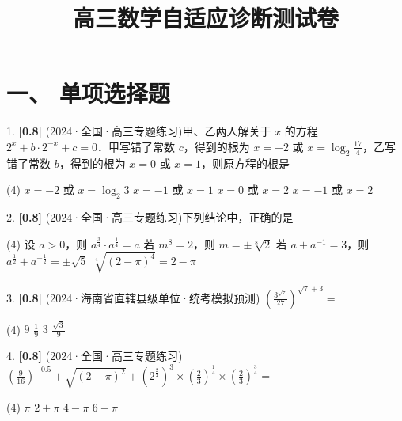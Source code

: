 \documentclass[11pt,a4paper]{article}
\title{\vspace{-2cm}\textbf{高三数学自适应诊断测试卷}}
\date{}
\begin{document}
\maketitle
\vspace{-1cm}
\section*{一、 单项选择题}
1. \textbf{[0.8]} (2024·全国·高三专题练习)甲、乙两人解关于 $x$ 的方程 $2^{x}+b \cdot 2^{-x}+c=0$．甲写错了常数 $c$，得到的根为 $x=-2$ 或 $x=\log _{2} \frac{17}{4}$，乙写错了常数 $b$，得到的根为 $x=0$ 或 $x=1$，则原方程的根是

\begin{tasks}(4)
    \task $x=-2$ 或 $x=\log _{2} 3$
    \task $x=-1$ 或 $x=1$
    \task $x=0$ 或 $x=2$
    \task $x=-1$ 或 $x=2$
\end{tasks}

\vspace{2.5cm}

2. \textbf{[0.8]} (2024·全国·高三专题练习)下列结论中，正确的是

\begin{tasks}(4)
    \task 设 $a>0$，则 $a^{\frac{3}{4}} \cdot a^{\frac{1}{4}}=a$
    \task 若 $m^{8}=2$，则 $m=\pm \sqrt[8]{2}$
    \task 若 $a+a^{-1}=3$，则 $a^{\frac{1}{2}}+a^{-\frac{1}{2}}=\pm \sqrt{5}$
    \task $\sqrt[4]{(2-\pi)^{4}}=2-\pi$
\end{tasks}

\vspace{2.5cm}

3. \textbf{[0.8]} (2024·海南省直辖县级单位·统考模拟预测) $\left(\frac{3^{\sqrt{7}}}{27}\right)^{\sqrt{7}+3}=$

\begin{tasks}(4)
    \task $9$
    \task $\frac{1}{9}$
    \task $3$
    \task $\frac{\sqrt{3}}{9}$
\end{tasks}

\vspace{2.5cm}

4. \textbf{[0.8]} (2024·全国·高三专题练习) $\left(\frac{9}{16}\right)^{-0.5}+\sqrt{(2-\pi)^{2}}+\left(2^{\frac{2}{3}}\right)^{3} \times\left(\frac{2}{3}\right)^{\frac{1}{4}} \times\left(\frac{2}{3}\right)^{\frac{3}{4}}=$

\begin{tasks}(4)
    \task $\pi$
    \task $2+\pi$
    \task $4-\pi$
    \task $6-\pi$
\end{tasks}

\vspace{2.5cm}
\end{document}
